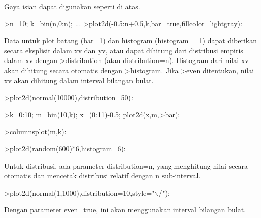 \documentclass{article}
\begin{document}
\begin{eulernotebook}
\begin{eulercomment}
\begin{eulercomment}
\begin{eulercomment}
\begin{eulercomment}
\begin{eulercomment}
\begin{eulercomment}
\begin{eulercomment}
\begin{eulercomment}
\begin{eulercomment}
\begin{eulercomment}
\begin{eulercomment}
Gaya isian dapat digunakan seperti di atas.
\end{eulercomment}
\begin{eulerprompt}
>n=10; k=bin(n,0:n); ...
>plot2d(-0.5:n+0.5,k,bar=true,fillcolor=lightgray):
\end{eulerprompt}
\begin{eulercomment}
Data untuk plot batang (bar=1) dan histogram (histogram = 1) dapat
diberikan secara eksplisit dalam xv dan yv, atau dapat dihitung dari
distribusi empiris dalam xv dengan \textgreater{}distribution (atau
distribution=n). Histogram dari nilai xv akan dihitung secara otomatis
dengan \textgreater{}histogram. Jika \textgreater{}even ditentukan, nilai xv akan dihitung dalam
interval bilangan bulat.
\end{eulercomment}
\begin{eulerprompt}
>plot2d(normal(10000),distribution=50):
\end{eulerprompt}
\begin{eulerprompt}
>k=0:10; m=bin(10,k); x=(0:11)-0.5; plot2d(x,m,>bar):
\end{eulerprompt}
\begin{eulerprompt}
>columnsplot(m,k):
\end{eulerprompt}
\begin{eulerprompt}
>plot2d(random(600)*6,histogram=6):
\end{eulerprompt}
\begin{eulercomment}
Untuk distribusi, ada parameter distribution=n, yang menghitung nilai
secara otomatis dan mencetak distribusi relatif dengan n sub-interval.
\end{eulercomment}
\begin{eulerprompt}
>plot2d(normal(1,1000),distribution=10,style="\(\backslash\)/"):
\end{eulerprompt}
\begin{eulercomment}
Dengan parameter even=true, ini akan menggunakan interval bilangan
bulat.
\end{eulercomment}
\begin{eulerprompt}

\end{eulerprompt}
\end{eulercomment}
\end{eulercomment}
\end{eulercomment}
\end{eulercomment}
\end{eulercomment}
\end{eulercomment}
\end{eulercomment}
\end{eulercomment}
\end{eulercomment}
\end{eulercomment}
\end{eulernotebook}
\end{document}
